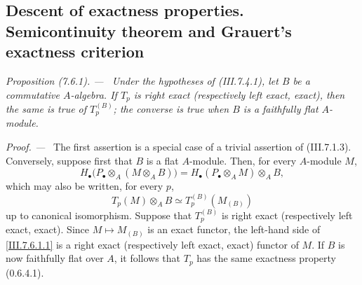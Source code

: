 \documentclass[10pt,oneside]{book}
\newcommand{\sref}[2][]{(#2)}
\newenvironment{proposition}[1][]{\par\medskip\noindent\itshape Proposition (#1). ---\ }{\par}
\newenvironment{proof}{\par\medskip\noindent\textit{Proof. ---\ }}{\par}
\begin{document}
\subsection{Descent of exactness properties. Semicontinuity theorem and
Grauert's exactness criterion}
\label{subsection:III.7.6}
\label{III.7.6}

\begin{proposition}[7.6.1]
\label{III.7.6.1}
Under the hypotheses of \sref{III.7.4.1}, let $B$ be a
commutative $A$-algebra.  If $T_p$ is right exact
(respectively left exact, exact), then the same is true of
$T_p^{(B)}$; the converse is true when $B$ is a faithfully
flat $A$-module.
\end{proposition}

\begin{proof}
The first assertion is a special case of a trivial assertion
of \sref{III.7.1.3}.  Conversely, suppose first that $B$ is a
flat $A$-module.  Then, for every $A$-module $M$,
\[
  H_\bullet\bigl(P_\bullet\otimes_A(M\otimes_A B)\bigr)
  =
  H_\bullet(P_\bullet\otimes_A M)\otimes_A B,
\]
which may also be written, for every $p$,
\[
  T_p(M)\otimes_A B
  \simeq
  T_p^{(B)}(M_{(B)})
  \tag{7.6.1.1}\label{III.7.6.1.1}
\]
up to canonical isomorphism.  Suppose that $T_p^{(B)}$ is
right exact (respectively left exact, exact).  Since
$M\mapsto M_{(B)}$ is an exact functor, the left-hand side of
\eqref{III.7.6.1.1} is a right exact (respectively left exact,
exact) functor of $M$.  If $B$ is now faithfully flat over
$A$, it follows that $T_p$ has the same exactness property
\sref[0]{0.6.4.1}.
\end{proof}
\end{document}
